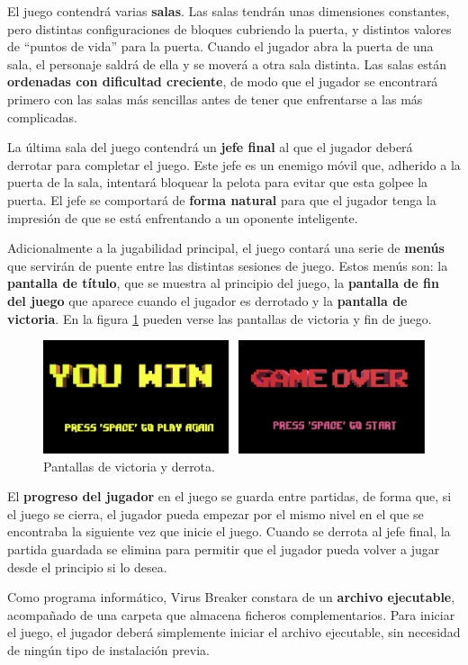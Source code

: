 El juego contendrá varias \textbf{salas}. Las salas tendrán unas dimensiones constantes, pero distintas configuraciones de bloques cubriendo la puerta, y distintos valores de ``puntos de vida'' para la puerta. Cuando el jugador abra la puerta de una sala, el personaje saldrá de ella y se moverá a otra sala distinta.  Las salas están \textbf{ordenadas con dificultad creciente}, de modo que el jugador se encontrará primero con las salas más sencillas antes de tener que enfrentarse a las más complicadas. 

La última sala del juego contendrá un \textbf{jefe final} al que el jugador deberá derrotar para completar el juego. Este jefe es un enemigo móvil que, adherido a la puerta de la sala, intentará bloquear la pelota para evitar que esta golpee la puerta. El jefe se comportará de \textbf{forma natural} para que el jugador tenga la impresión de que se está enfrentando a un oponente inteligente.

Adicionalmente a la jugabilidad principal, el juego contará una serie de \textbf{menús} que servirán de puente entre las distintas sesiones de juego. Estos menús son: la \textbf{pantalla de título}, que se muestra al principio del juego, la \textbf{pantalla de fin del juego} que aparece cuando el jugador es derrotado y la \textbf{pantalla de victoria}. En la figura \ref{win_lose} pueden verse las pantallas de victoria y fin de juego.
\begin{figure}[!t]
    \centering
    \includegraphics[width=1\textwidth]{images/estructura/descripcion/win_lose}
    \caption{Pantallas de victoria y derrota.}
    \label{win_lose}
\end{figure}

El \textbf{progreso del jugador} en el juego se guarda entre partidas, de forma que, si el juego se cierra, el jugador pueda empezar por el mismo nivel en el que se encontraba la siguiente vez que inicie el juego. Cuando se derrota al jefe final, la partida guardada se elimina para permitir que el jugador pueda volver a jugar desde el principio si lo desea.

Como programa informático, Virus Breaker constara de un \textbf{archivo ejecutable}, acompañado de una carpeta que almacena ficheros complementarios. Para iniciar el juego, el jugador deberá simplemente iniciar el archivo ejecutable, sin necesidad de ningún tipo de instalación previa. 

